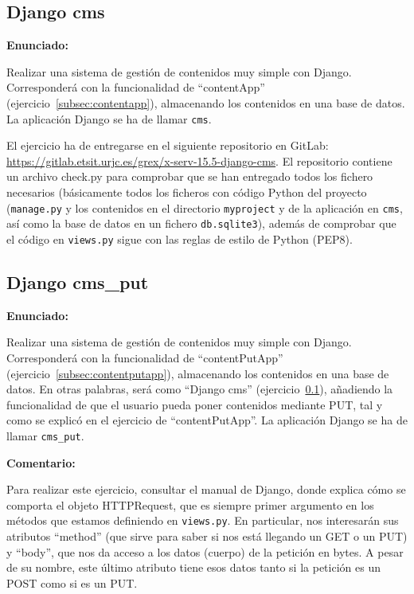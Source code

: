 \subsection{Django cms}
\label{subsec:django-cms}

\textbf{Enunciado:}

Realizar una sistema de gestión de contenidos muy simple con Django. Corresponderá con la funcionalidad de ``contentApp'' (ejercicio~\ref{subsec:contentapp}), almacenando los contenidos en una base de datos. La aplicación Django se ha de llamar \texttt{cms}.

El ejercicio ha de entregarse en el siguiente repositorio en GitLab: 
\url{https://gitlab.etsit.urjc.es/grex/x-serv-15.5-django-cms}. El repositorio contiene
un archivo check.py para comprobar que se han entregado todos los fichero necesarios (básicamente todos los ficheros con código Python del proyecto (\texttt{manage.py} y los contenidos en el directorio \texttt{myproject} y de la aplicación en \texttt{cms}, así como la base de datos en un fichero \texttt{db.sqlite3}), además de comprobar que el código en
\texttt{views.py} sigue con las reglas de estilo de Python (PEP8).

%


\subsection{Django cms\_put}
\label{subsec:django-cms-put}

\textbf{Enunciado:}

Realizar una sistema de gestión de contenidos muy simple con Django. Corresponderá con la funcionalidad de ``contentPutApp'' (ejercicio~\ref{subsec:contentputapp}), almacenando los contenidos en una base de datos. En otras palabras, será como ``Django cms'' (ejercicio~\ref{subsec:django-cms}), añadiendo la funcionalidad de que el usuario pueda poner contenidos mediante PUT, tal y como se explicó en el ejercicio de ``contentPutApp''. La aplicación Django se ha de llamar \texttt{cms\_put}.


\textbf{Comentario:}

Para realizar este ejercicio, consultar el manual de Django, donde explica cómo se comporta el objeto HTTPRequest, que es siempre primer argumento en los métodos que estamos definiendo en \texttt{views.py}. En particular, nos interesarán sus atributos ``method'' (que sirve para saber si nos está llegando un GET o un PUT) y ``body'', que nos da acceso a los datos (cuerpo) de la petición en bytes. A pesar de su nombre, este último atributo tiene esos datos tanto si la petición es un POST como si es un PUT. 

